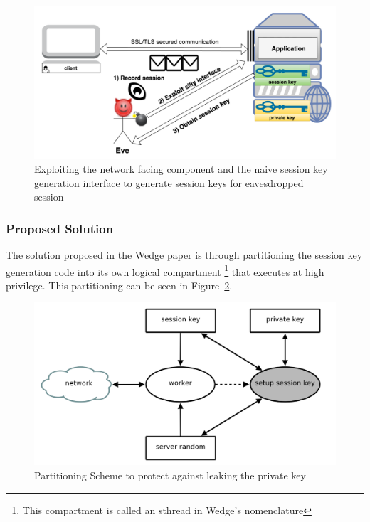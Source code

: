\documentclass[../main.tex]{subfiles}
\begin{document}
\begin{enumerate}
	\begin{figure}[H]
          \centering
          \includegraphics[scale=0.15]{images/attack2.png}
          \caption{Exploiting the network facing component and the
            naive session key generation interface to generate session
            keys for eavesdropped session}
          \label{fig:attack2}
	\end{figure}
\end{enumerate}

\subsubsection*{Proposed Solution} 
The solution proposed in the Wedge paper is through partitioning the
session key generation code into its own logical compartment
\footnote{This compartment is called an sthread in Wedge's
  nomenclature} that executes at high privilege.  This partitioning
can be seen in Figure~\ref{fig:wedge-partition}.

\begin{figure}[H]
  \centering
  \includegraphics[scale=0.25]{images/compartment_01.png}
  \caption{Partitioning Scheme to protect against leaking the private
    key~\cite{Bittau08}}
  \label{fig:wedge-partition}
\end{figure}
\end{document}
